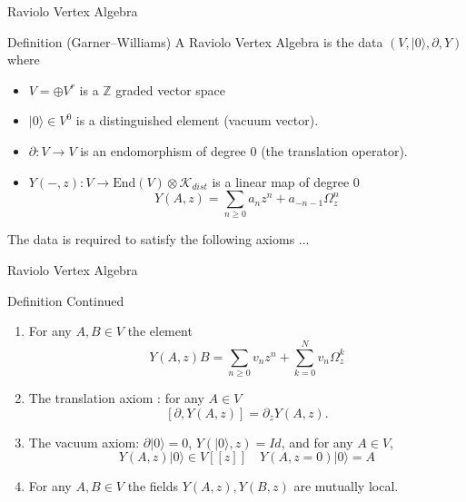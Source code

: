 \documentclass{beamer}
\newcommand{\Z}{\mathbb{Z}}
\begin{document}
\begin{frame}{Raviolo Vertex Algebra}
    \begin{block}{Definition (Garner--Williams)}
        A Raviolo Vertex Algebra is the data $(V, |0\rangle , \partial, Y) $ where

        \begin{itemize}
            \item $V = \oplus V^r$ is a $\Z$ graded vector space
            \item $|0\rangle  \in V^0$ is a distinguished element (vacuum vector).
            \item $ \partial : V \to V$ is an endomorphism of degree 0 (the translation operator).
            \item $Y(-,z):V \to \mbox{End}(V) \otimes \mathcal{K}_{dist}$ is a linear map of degree 0
            \[
            Y(A,z) = \sum_{n \geq 0 } a_n z^n + a_{-n-1} \Omega^n_z 
            \]
            

        \end{itemize}

        The data is required to satisfy the following axioms ...
    \end{block}
\end{frame}



\begin{frame}{Raviolo Vertex Algebra}
    \begin{block}{Definition Continued}
        \begin{enumerate}
            \item For any $A,B\in V$ the element 
            \[
            Y(A,z)B = \sum_{n \geq 0} v_n z^n + \sum_{k=0}^N v_n \Omega_z^k
            \]
            \item The translation axiom : for any $A \in V$ 
                  \[
                      [\partial,Y(A,z)] = \partial_z Y(A,z).
                  \]
                  
            \item The vacuum axiom: $\partial |0 \rangle = 0 $, $Y(|0\rangle,z) = Id$, and for any $A\in V$, 
            \[Y(A,z)|0\rangle \in V[[z]] \quad Y(A,z=0)|0\rangle = A\]

            \item For any $A,B\in V$ the fields $Y(A,z), Y(B,z)$ are mutually local.
        \end{enumerate}
    \end{block}
\end{frame}
\end{document}
